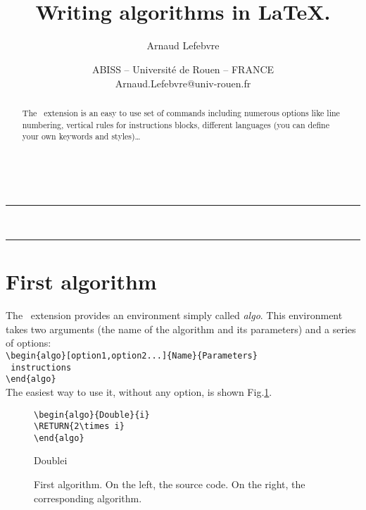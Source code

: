 \documentclass{article}
\title{\ALgo\\\small{Writing algorithms in \LaTeX.}}
\author{Arnaud Lefebvre}
\date{ABISS -- Universit\'e de Rouen -- FRANCE\\Arnaud.Lefebvre@univ-rouen.fr}
\begin{document}
\maketitle
\begin{abstract}
The \ALgo\ extension is an easy to use set of commands including numerous
 options like line numbering, vertical rules for instructions blocks, 
 different languages (you can define your own keywords and styles)\ldots
\end{abstract}
~\\
\hrule
\tableofcontents
~\\
\hrule
\newpage
\section{First algorithm}

The \ALgo\ extension provides an environment simply called \textit{algo}.
This environment takes two arguments (the name of the algorithm and its parameters) and a series of options:\\

\noindent\verb!\begin{algo}[option1,option2...]{Name}{Parameters}!\\
\noindent\verb!	instructions!\nopagebreak\\
\noindent\verb!\end{algo}!\\

The easiest way to use it, without any option, is shown Fig.\ref{fig:env}.
\begin{figure}[b]
\begin{center}
\begin{minipage}{\textwidth}
\setlength{\columnseprule}{1pt}
\begin{multicols}{2}
\verb!\begin{algo}{Double}{i}!\\
\verb!\RETURN{2\times i}!\\
\verb!\end{algo}!\\
\begin{algo}{Double}{i}
\end{algo}
\end{multicols}
\end{minipage}
\end{center}
\caption{\label{fig:env}First algorithm. On the left, the source code. On the right, the corresponding algorithm.} 
\end{figure}
\end{document}
